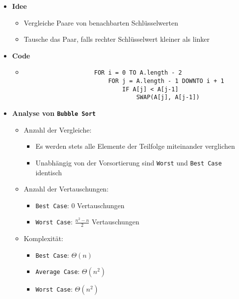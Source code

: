     \begin{itemize}
        \item \textbf{Idee}
            \begin{itemize}
                \item Vergleiche Paare von benachbarten Schlüsselwerten
                \item Tausche das Paar, falls rechter Schlüsselwert kleiner als linker
            \end{itemize}
        
        \item \textbf{Code}
            \begin{itemize}
                \item[]
                    \begin{verbatim}  
                    FOR i = 0 TO A.length - 2
                        FOR j = A.length - 1 DOWNTO i + 1
                            IF A[j] < A[j-1]
                                SWAP(A[j], A[j-1])
                    \end{verbatim}
            \end{itemize}

        \item \textbf{Analyse von \texttt{Bubble Sort}}
            \begin{itemize}
                \item Anzahl der Vergleiche:
                    \begin{itemize}
                        \item Es werden stets alle Elemente der Teilfolge miteinander verglichen
                        \item Unabhängig von der Vorsortierung sind \texttt{Worst} und \texttt{Best Case} identisch
                    \end{itemize}
                
                \item Anzahl der Vertauschungen:
                    \begin{itemize}
                        \item \texttt{Best Case}: 0 Vertauschungen
                        \item \texttt{Worst Case}: $\frac{n^2-n}{2}$ Vertauschungen
                    \end{itemize}
                
                \item Komplexität:
                    \begin{itemize}
                        \item \texttt{Best Case}: $\Theta(n)$
                        \item \texttt{Average Case}: $\Theta(n^2)$
                        \item \texttt{Worst Case}: $\Theta(n^2)$
                    \end{itemize}
            \end{itemize}
        
    \end{itemize}

